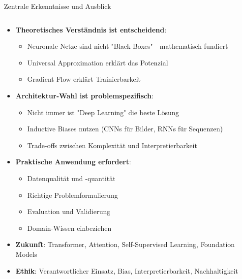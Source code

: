 \documentclass[aspectratio=1610, xcolor=dvipsnames, 9pt]{beamer}
\begin{document}
\begin{frame}{Zentrale Erkenntnisse und Ausblick}
  \begin{columns}
    \begin{column}{1\textwidth}
      \begin{itemize}
        \item \textbf{Theoretisches Verständnis ist entscheidend}:
        \begin{itemize}
          \item Neuronale Netze sind nicht "Black Boxes" - mathematisch fundiert
          \item Universal Approximation erklärt das Potenzial
          \item Gradient Flow erklärt Trainierbarkeit
        \end{itemize}
        \item \textbf{Architektur-Wahl ist problemspezifisch}:
        \begin{itemize}
          \item Nicht immer ist "Deep Learning" die beste Lösung
          \item Inductive Biases nutzen (CNNs für Bilder, RNNs für Sequenzen)
          \item Trade-offs zwischen Komplexität und Interpretierbarkeit
        \end{itemize}
        \item \textbf{Praktische Anwendung erfordert}:
        \begin{itemize}
          \item Datenqualität und -quantität
          \item Richtige Problemformulierung
          \item Evaluation und Validierung
          \item Domain-Wissen einbeziehen
        \end{itemize}
        \item \textbf{Zukunft}: Transformer, Attention, Self-Supervised Learning, Foundation Models
        \item \textbf{Ethik}: Verantwortlicher Einsatz, Bias, Interpretierbarkeit, Nachhaltigkeit
      \end{itemize}
    \end{column}
  \end{columns}
\end{frame}
\end{document}
